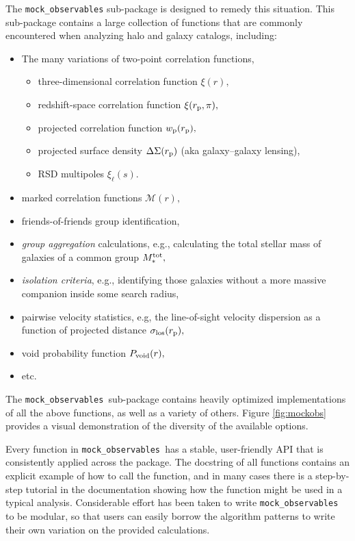 \documentclass[twocolumn, tighten]{aastex6}
\newcommand{\bit}{\begin{itemize}}
\newcommand{\eit}{\end{itemize}}
\newcommand{\rproj}{r_{\rm p}}
\newcommand{\mockobs}{{\tt mock\_observables }}
\begin{document}
The {\tt mock\_observables} sub-package is designed to remedy this situation. This sub-package contains a large collection of functions that are commonly encountered when analyzing halo and galaxy catalogs, including:

\bit
\item The many variations of two-point correlation functions,
\bit
\item three-dimensional correlation function $\xi(r),$
\item redshift-space correlation function $\xi(\rproj, \pi),$
\item projected correlation function $w_{\rm p}(\rproj),$
\item projected surface density $\Delta\Sigma(r_{\rm p})$ (aka galaxy--galaxy lensing),
\item RSD multipoles $\xi_{\ell}(s).$
\eit
\item marked correlation functions $\mathcal{M}(r),$
\item friends-of-friends group identification,
\item {\em group aggregation} calculations, e.g., calculating the total stellar mass of galaxies of a common group $M_{\ast}^{\rm tot},$
\item {\em isolation criteria}, e.g., identifying those galaxies without a more massive companion inside some search radius,
\item pairwise velocity statistics, e.g, the line-of-sight velocity dispersion as a function of projected distance $\sigma_{\rm los}(\rproj),$
\item void probability function $P_{\rm void}(r),$
\item etc.
\eit
The \mockobs sub-package contains heavily optimized implementations of all the above functions, as well as a variety of others. Figure \ref{fig:mockobs} provides a visual demonstration of the diversity of the available options.

Every function in \mockobs has a stable, user-friendly API that is consistently applied across the package. The docstring of all functions contains an explicit example of how to call the function, and in many cases there is a step-by-step tutorial in the documentation showing how the function might be used in a typical analysis. Considerable effort has been taken to write \mockobs to be modular, so that users can easily borrow the algorithm patterns to write their own variation on the provided calculations.
\end{document}
